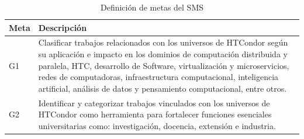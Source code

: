 \begin{table}[H]
	\centering
	\renewcommand{\arraystretch}{1.2} %
	\footnotesize %
	\begin{tabular}{|p{1.5cm}|p{12.5cm}|}  %
		\hline
		\textbf{Meta} & \textbf{Descripción}                                                                                                                                                                                                                                                                                                                                         \\ \hline
		G1            & Clasificar trabajos relacionados con los universos de HTCondor según su aplicación e impacto en los dominios de computación distribuida y paralela, HTC, desarrollo de Software, virtualización y microservicios, redes de computadoras, infraestructura computacional, inteligencia artificial, análisis de datos y pensamiento computacional, entre otros. \\ \hline
		G2            & Identificar y categorizar trabajos vinculados con los universos de HTCondor como herramienta para fortalecer funciones esenciales universitarias como: investigación, docencia, extensión e industria.                                                                                                                                                       \\ \hline
	\end{tabular}
	\caption{Definición de metas del SMS}
	\label{tab:metas}
\end{table}


